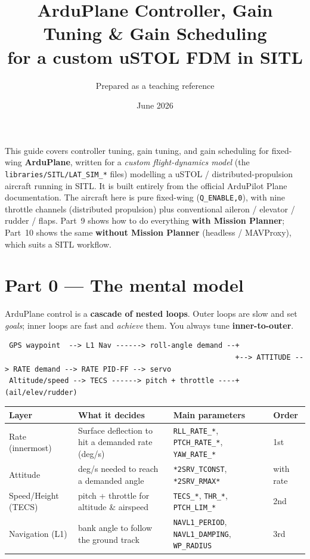 \documentclass[11pt,a4paper]{article}
\title{\textbf{ArduPlane Controller, Gain Tuning \& Gain Scheduling}\\[4pt]
\large for a custom uSTOL FDM in SITL}
\author{Prepared as a teaching reference}
\date{June 2026}
\newcommand{\pp}[1]{\texttt{#1}} %
\begin{document}
\maketitle

\noindent This guide covers controller tuning, gain tuning, and gain scheduling
for fixed-wing \textbf{ArduPlane}, written for a \emph{custom flight-dynamics
model} (the \pp{libraries/SITL/LAT\_SIM\_*} files) modelling a uSTOL /
distributed-propulsion aircraft running in SITL. It is built entirely from the
official ArduPilot Plane documentation. The aircraft here is pure fixed-wing
(\pp{Q\_ENABLE,0}), with nine throttle channels (distributed propulsion) plus
conventional aileron / elevator / rudder / flaps. Part~9 shows how to do
everything \textbf{with Mission Planner}; Part~10 shows the same \textbf{without
Mission Planner} (headless / MAVProxy), which suits a SITL workflow.

\tableofcontents
\newpage

\section{Part 0 --- The mental model}

ArduPlane control is a \textbf{cascade of nested loops}. Outer loops are slow and
set \emph{goals}; inner loops are fast and \emph{achieve} them. You always tune
\textbf{inner-to-outer}.

\begin{lstlisting}
 GPS waypoint  --> L1 Nav ------> roll-angle demand --+
                                                      +--> ATTITUDE --> RATE demand --> RATE PID-FF --> servo
 Altitude/speed --> TECS ------> pitch + throttle ----+                                                (ail/elev/rudder)
\end{lstlisting}

\begin{longtable}{@{}p{3.1cm}p{6.0cm}p{4.6cm}p{1.7cm}@{}}
\toprule
\textbf{Layer} & \textbf{What it decides} & \textbf{Main parameters} & \textbf{Order}\\
\midrule
\endhead
Rate (innermost) & Surface deflection to hit a demanded rate (deg/s) & \pp{RLL\_RATE\_*}, \pp{PTCH\_RATE\_*}, \pp{YAW\_RATE\_*} & 1st\\
Attitude & deg/s needed to reach a demanded angle & \pp{*2SRV\_TCONST}, \pp{*2SRV\_RMAX*} & with rate\\
Speed/Height (TECS) & pitch + throttle for altitude \& airspeed & \pp{TECS\_*}, \pp{THR\_*}, \pp{PTCH\_LIM\_*} & 2nd\\
Navigation (L1) & bank angle to follow the ground track & \pp{NAVL1\_PERIOD}, \pp{NAVL1\_DAMPING}, \pp{WP\_RADIUS} & 3rd\\
\bottomrule
\end{longtable}
\end{document}
